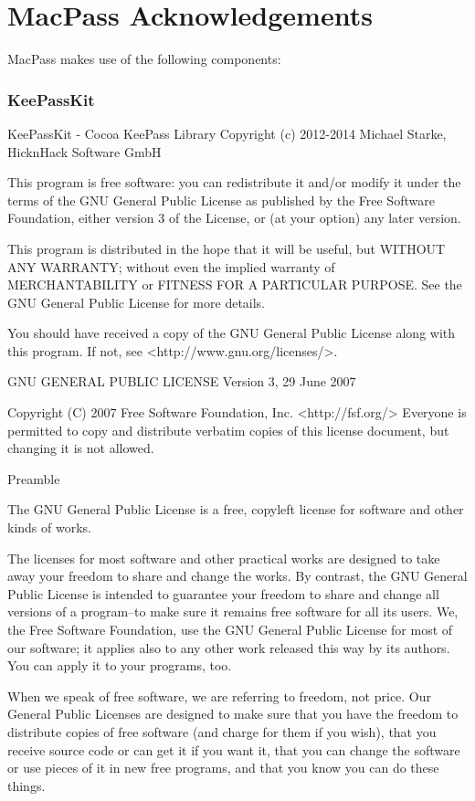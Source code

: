 \documentclass[parskip=half]{scrartcl}
\begin{document}
 

\part*{MacPass Acknowledgements}

MacPass makes use of the following components:

\section*{KeePassKit}
KeePassKit - Cocoa KeePass Library
Copyright (c) 2012-2014  Michael Starke, HicknHack Software GmbH

This program is free software: you can redistribute it and/or modify
it under the terms of the GNU General Public License as published by
the Free Software Foundation, either version 3 of the License, or
(at your option) any later version.

This program is distributed in the hope that it will be useful,
but WITHOUT ANY WARRANTY; without even the implied warranty of
MERCHANTABILITY or FITNESS FOR A PARTICULAR PURPOSE.  See the
GNU General Public License for more details.

You should have received a copy of the GNU General Public License
along with this program.  If not, see <http://www.gnu.org/licenses/>.


                    GNU GENERAL PUBLIC LICENSE
                       Version 3, 29 June 2007

 Copyright (C) 2007 Free Software Foundation, Inc. <http://fsf.org/>
 Everyone is permitted to copy and distribute verbatim copies
 of this license document, but changing it is not allowed.

                            Preamble

  The GNU General Public License is a free, copyleft license for
software and other kinds of works.

  The licenses for most software and other practical works are designed
to take away your freedom to share and change the works.  By contrast,
the GNU General Public License is intended to guarantee your freedom to
share and change all versions of a program--to make sure it remains free
software for all its users.  We, the Free Software Foundation, use the
GNU General Public License for most of our software; it applies also to
any other work released this way by its authors.  You can apply it to
your programs, too.

  When we speak of free software, we are referring to freedom, not
price.  Our General Public Licenses are designed to make sure that you
have the freedom to distribute copies of free software (and charge for
them if you wish), that you receive source code or can get it if you
want it, that you can change the software or use pieces of it in new
free programs, and that you know you can do these things.
\end{document}
